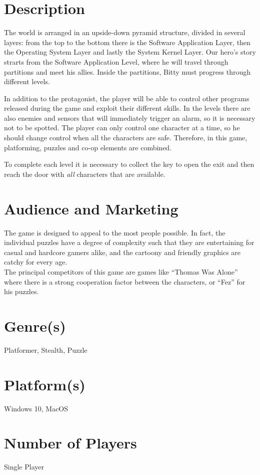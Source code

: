 \documentclass[12pt, a4paper]{report}
\begin{document}
\section*{Description}
The world is arranged in an upside-down pyramid structure, divided in several layers: from the top to the bottom there is the Software Application Layer, then the Operating System Layer and lastly the System Kernel Layer. Our hero’s story strarts from the Software Application Level, where he will travel through partitions and meet his allies. Inside the partitions, Bitty must progress through different levels.

In addition to the protagonist, the player will be able to control other programs released during the game and exploit their different skills. In the levels there are also enemies and sensors that will immediately trigger an alarm, so it is necessary not to be spotted. The player can only control one character at a time, so he should change control when all the characters are safe. Therefore, in this game, platforming, puzzles and co-op elements are combined.

To complete each level it is necessary to collect the key to open the exit and then reach the door with \textit{all} characters that are available.

\section*{Audience and Marketing}
The game is designed to appeal to the most people possible. In fact, the individual puzzles have a degree of complexity such that they are entertaining for casual and hardcore gamers alike, and the cartoony and friendly graphics are catchy for every age.\\
The principal competitors of this game are games like “Thomas Was Alone” where there is a strong cooperation factor between the characters, or “Fez” for his puzzles.

\section*{Genre(s)}
Platformer, Stealth, Puzzle
\section*{Platform(s)}
Windows 10, MacOS
\section*{Number of Players}
Single Player
\end{document}
